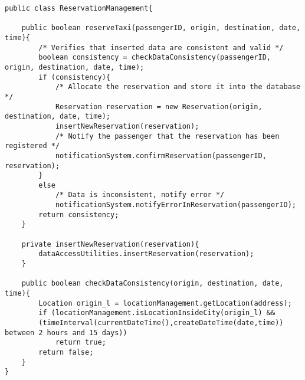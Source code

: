 \begin{lstlisting}
public class ReservationManagement{

	public boolean reserveTaxi(passengerID, origin, destination, date, time){
		/* Verifies that inserted data are consistent and valid */
		boolean consistency = checkDataConsistency(passengerID, origin, destination, date, time);
		if (consistency){
			/* Allocate the reservation and store it into the database */
			Reservation reservation = new Reservation(origin, destination, date, time);
			insertNewReservation(reservation);
			/* Notify the passenger that the reservation has been registered */
			notificationSystem.confirmReservation(passengerID, reservation);
		}
		else
			/* Data is inconsistent, notify error */
			notificationSystem.notifyErrorInReservation(passengerID);
		return consistency;
	}
	
	private insertNewReservation(reservation){
		dataAccessUtilities.insertReservation(reservation);
	}
	
	public boolean checkDataConsistency(origin, destination, date, time){
		Location origin_l = locationManagement.getLocation(address);
		if (locationManagement.isLocationInsideCity(origin_l) && 
		(timeInterval(currentDateTime(),createDateTime(date,time)) between 2 hours and 15 days))
			return true;
		return false; 
	}
}	
\end{lstlisting}

